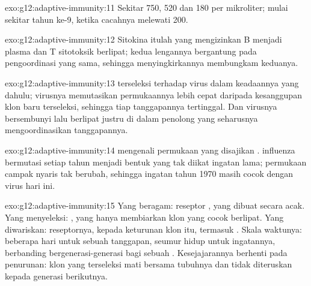 \begin{solution}{exo:g12:adaptive-immunity:11}
Sekitar 750, 520 dan 180 per mikroliter;  mulai sekitar tahun ke-9,
ketika cacahnya melewati 200.
\end{solution}

\begin{solution}{exo:g12:adaptive-immunity:12}
Sitokina  itulah yang mengizinkan  B menjadi 
plasma dan  T sitotoksik berlipat; kedua lengannya bergantung pada
pengoordinasi yang sama, sehingga menyingkirkannya membungkam keduanya.
\end{solution}

\begin{solution}{exo:g12:adaptive-immunity:13}
 terseleksi terhadap virus dalam keadaannya yang dahulu;
virusnya memutasikan  permukaannya lebih cepat daripada
kesanggupan klon baru terseleksi, sehingga tiap tanggapannya
tertinggal. Dan virusnya bersembunyi lalu berlipat justru di dalam 
penolong yang seharusnya mengoordinasikan tanggapannya.
\end{solution}

\begin{solution}{exo:g12:adaptive-immunity:14}
 mengenali  permukaan yang disajikan .
 influenza bermutasi setiap tahun menjadi bentuk yang tak
diikat ingatan lama;  permukaan campak nyaris tak berubah,
sehingga ingatan tahun 1970 masih cocok dengan virus hari ini.
\end{solution}

\begin{solution}{exo:g12:adaptive-immunity:15}
Yang beragam: reseptor , yang dibuat secara acak. Yang
menyeleksi: , yang hanya membiarkan klon yang cocok berlipat.
Yang diwariskan: reseptornya, kepada keturunan klon itu, termasuk . Skala waktunya: beberapa hari untuk sebuah tanggapan,
seumur hidup untuk ingatannya, berbanding bergenerasi-generasi bagi
sebuah . Kesejajarannya berhenti pada penurunan: klon yang
terseleksi mati bersama tubuhnya dan tidak diteruskan kepada generasi
berikutnya.
\end{solution}

